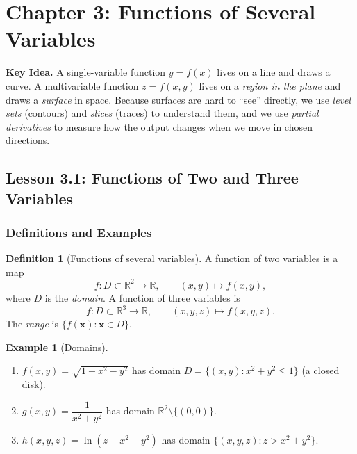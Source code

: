 \documentclass[12pt]{article}
\numberwithin{equation}{section}
\newcommand{\RR}{\mathbb{R}}
\newcommand{\vect}[1]{\boldsymbol{#1}}   %
\theoremstyle{plain}
\theoremstyle{definition}
\newtheorem{definition}[theorem]{Definition}
\newtheorem{example}[theorem]{Example}
\theoremstyle{remark}
\newenvironment{keyidea}{\begin{tcolorbox}\textbf{Key Idea.}}{\end{tcolorbox}}
\begin{document}

\section{Chapter 3: Functions of Several Variables}

\begin{keyidea}
A single-variable function $y=f(x)$ lives on a line and draws a curve.  
A multivariable function $z=f(x,y)$ lives on a \emph{region in the plane} and draws a \emph{surface} in space.  
Because surfaces are hard to “see” directly, we use \emph{level sets} (contours) and \emph{slices} (traces) to understand them, and we use \emph{partial derivatives} to measure how the output changes when we move in chosen directions.
\end{keyidea}

\subsection{Lesson 3.1: Functions of Two and Three Variables}

\subsubsection{Definitions and Examples}

\begin{definition}[Functions of several variables]
A function of two variables is a map
\[
f:D\subset \RR^2 \to \RR,\qquad (x,y)\mapsto f(x,y),
\]
where $D$ is the \emph{domain}. A function of three variables is
\[
f:D\subset \RR^3 \to \RR,\qquad (x,y,z)\mapsto f(x,y,z).
\]
The \emph{range} is $\{f(\vect x): \vect x\in D\}$.
\end{definition}

\begin{example}[Domains]
\begin{enumerate}[label=(\alph*)]
\item $f(x,y)=\sqrt{1-x^2-y^2}$ has domain $D=\{(x,y):x^2+y^2\le 1\}$ (a closed disk).
\item $g(x,y)=\dfrac{1}{x^2+y^2}$ has domain $\RR^2\setminus\{(0,0)\}$.
\item $h(x,y,z)=\ln(z-x^2-y^2)$ has domain $\{(x,y,z): z>x^2+y^2\}$.
\end{enumerate}
\end{example}
\end{document}
